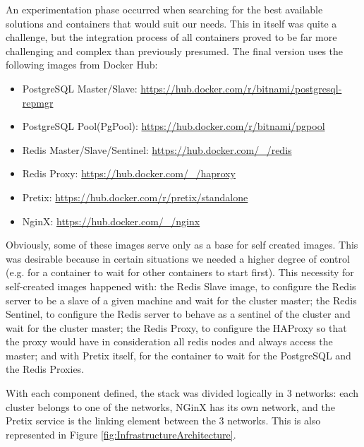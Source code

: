 \documentclass[12pt]{article}
\begin{document}
An experimentation phase occurred when searching for the best available solutions and containers that would suit our needs.
This in itself was quite a challenge, but the integration process of all containers proved to be far more challenging and complex than previously presumed.
The final version uses the following images from Docker Hub:
\vspace{-10pt}
\begin{itemize} [noitemsep]
  \item PostgreSQL Master/Slave: \href{https://hub.docker.com/r/bitnami/postgresql-repmgr}{https://hub.docker.com/r/bitnami/postgresql-repmgr}
  \item PostgreSQL Pool(PgPool): \href{https://hub.docker.com/r/bitnami/pgpool}{https://hub.docker.com/r/bitnami/pgpool}
  \item Redis Master/Slave/Sentinel: \href{https://hub.docker.com/\_/redis}{https://hub.docker.com/\_/redis}
  \item Redis Proxy: \href{https://hub.docker.com/\_/haproxy}{https://hub.docker.com/\_/haproxy}
  \item Pretix: \href{https://hub.docker.com/r/pretix/standalone}{https://hub.docker.com/r/pretix/standalone}
  \item NginX: \href{https://hub.docker.com/\_/nginx}{https://hub.docker.com/\_/nginx}
\end{itemize}
\vspace{-10pt}
Obviously, some of these images serve only as a base for self created images. 
This was desirable because in certain situations we needed a higher degree of control (e.g. for a container to wait for other containers to start first). 
This necessity for self-created images happened with: the Redis Slave image, to configure the Redis server to be a slave of a given machine and wait for the 
cluster master; the Redis Sentinel, to configure the Redis server to behave as a sentinel of the cluster and wait for the cluster master; the Redis Proxy, to 
configure the HAProxy so that the proxy would have in consideration all redis nodes and always access the master; and with Pretix itself, for the container 
to wait for the PostgreSQL and the Redis Proxies.

With each component defined, the stack was divided logically in 3 networks: each cluster belongs to one of the networks, NGinX has its own network, and the 
Pretix service is the linking element between the 3 networks.
This is also represented in Figure \ref{fig:InfrastructureArchitecture}.
\end{document}
